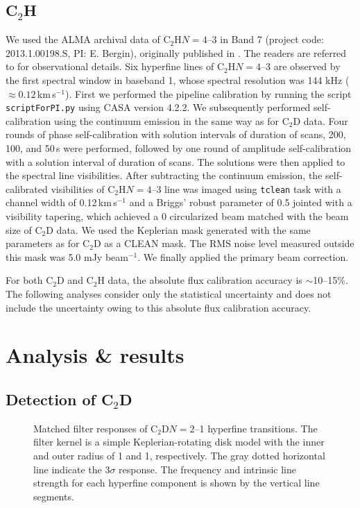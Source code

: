 \documentclass[linenumbers, twocolumn, times]{aastex631}
\newcommand{\CCH}{C$_2$H\xspace}
\newcommand{\CCD}{C$_2$D\xspace}
\begin{document}
\subsection{C$_2$H}
We used the ALMA archival data of \CCH $N=4$--3 in Band 7 (project code: 2013.1.00198.S, PI: E. Bergin), originally published in \citet{Bergin2016}. The readers are referred to \citet{Bergin2016} for observational details. Six hyperfine lines of \CCH $N=4$--3 are observed by the first spectral window in baseband 1, whose spectral resolution was 144 kHz (${\approx}0.12$\,km\,s$^{-1}$). First we performed the pipeline calibration by running the script \texttt{scriptForPI.py} using CASA version 4.2.2. We subsequently performed self-calibration using the continuum emission in the same way as for \CCD data. Four rounds of phase self-calibration with solution intervals of duration of scans, 200, 100, and 50\,s were performed, followed by one round of amplitude self-calibration with a solution interval of duration of scans. The solutions were then applied to the spectral line visibilities. After subtracting the continuum emission, the self-calibrated visibilities of \CCH $N=4$--3 line was imaged using \texttt{tclean} task with a channel width of 0.12\,km\,s$^{-1}$ and a Briggs' robust parameter of 0.5 jointed with a visibility tapering, which achieved a 0 circularized beam matched with the beam size of \CCD data. We used the Keplerian mask generated with the same parameters as for \CCD as a CLEAN mask. The RMS noise level measured outside this mask was 5.0 mJy beam$^{-1}$. We finally applied the primary beam correction.

For both \CCD and \CCH data, the absolute flux calibration accuracy is ${\sim}$10--15\%. The following analyses consider only the statistical uncertainty and does not include the uncertainty owing to this absolute flux calibration accuracy.


\section{Analysis \& results} \label{sec:analysis}

\subsection{Detection of \CCD}
\begin{figure}
\caption{}
\label{fig:abundance_comparison}
\end{figure}
\begin{figure}
\caption{Matched filter responses of \CCD $N=2$--1 hyperfine transitions. The filter kernel is a simple Keplerian-rotating disk model with the inner and outer radius of 1 and 1, respectively. The gray dotted horizontal line indicate the $3\sigma$ response. The frequency and intrinsic line strength for each hyperfine component is shown by the vertical line segments.}
\label{fig:abundance_comparison}
\end{figure}
\end{document}
